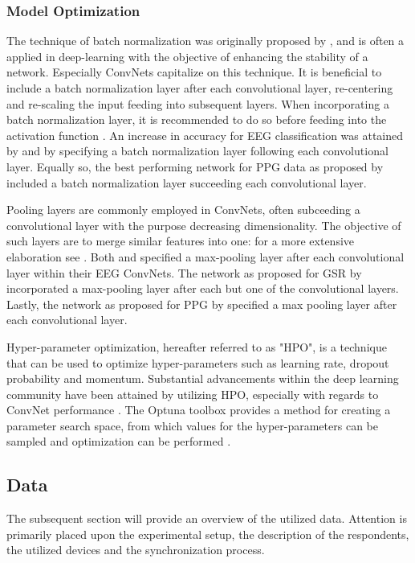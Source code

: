 \documentclass[12pt]{article}
\begin{document}
\subsubsection{Model Optimization}
The technique of batch normalization was originally proposed by , and is often a applied in deep-learning with the objective of enhancing the stability of a network. Especially ConvNets capitalize on this technique. It is beneficial to include a batch normalization layer after each convolutional layer, re-centering and re-scaling the input feeding into subsequent layers. When incorporating a batch normalization layer, it is recommended to do so before feeding into the activation function \cite{ioffe2015batch}. An increase in accuracy for EEG classification was attained by  and  by specifying a batch normalization layer following each convolutional layer. Equally so, the best performing network for PPG data as proposed by  included a batch normalization layer succeeding each convolutional layer. 

Pooling layers are commonly employed in ConvNets, often subceeding a convolutional layer with the purpose decreasing dimensionality. The objective of such layers are to merge similar features into one: for a more extensive elaboration see . Both  and  specified a max-pooling layer after each convolutional layer within their EEG ConvNets. The network as proposed for GSR by  incorporated a max-pooling layer after each but one of the convolutional layers. Lastly, the network as proposed for PPG by \cite{biswas2019cornet} specified a max pooling layer after each convolutional layer. 

Hyper-parameter optimization, hereafter referred to as "HPO", is a technique that can be used to optimize hyper-parameters such as learning rate, dropout probability and momentum. Substantial advancements within the deep learning community have been attained by utilizing HPO, especially with regards to ConvNet performance \cite{bergstra2012random}. The Optuna toolbox provides a method for creating a parameter search space, from which values for the hyper-parameters can be sampled and optimization can be performed \cite{akiba2019optuna}. 

\subsection{Data}
The subsequent section will provide an overview of the utilized data. Attention is primarily placed upon the experimental setup, the description of the respondents, the utilized devices and the synchronization process. 
\end{document}
